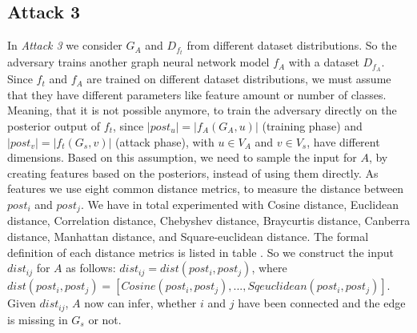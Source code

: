     \subsection*{Attack 3}
      In \emph{Attack 3} we consider $G_A$ and $D_{f_t}$ from different dataset distributions.
      So the adversary trains another graph neural network model $f_A$ with a dataset $D_{f_A}$.
      Since $f_t$ and $f_A$ are trained on different dataset distributions, we must assume that they have different parameters like feature amount or number of classes. 
      Meaning, that it is not possible anymore, to train the adversary directly on the posterior output of $f_t$, since $|post_u| = |f_A(G_A,u)|$ (training phase) and $|post_v| = |f_t(G_s,v)|$ (attack phase), with $u \in V_A$ and $v \in V_s$, have different dimensions.
      Based on this assumption, we need to sample the input for $A$, by creating features based on the posteriors, instead of using them directly.
      As features we use eight common distance metrics, to measure the distance between $post_i$ and $post_j$.
      We have in total experimented with Cosine distance, Euclidean distance, Correlation distance, Chebyshev distance, Braycurtis distance, Canberra distance, Manhattan distance, and Square-euclidean distance.
      The formal definition of each distance metrics is listed in table .
      So we construct the input $dist_{ij}$ for $A$ as follows: $dist_{ij} = dist(post_i, post_j)$, where $dist(post_i, post_j) = [Cosine(post_i,post_j), ..., Sqeuclidean(post_i,post_j)]$.
      Given $dist_{ij}$, $A$ now can infer, whether $i$ and $j$ have been connected and the edge is missing in $G_s$ or not.

